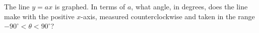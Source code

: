 The line $y=ax$ is graphed. In terms of $a$, what angle, in degrees, does the line make with the positive $x$-axis, measured counterclockwise and taken in the range $-90^\circ<\theta<90^\circ$?
